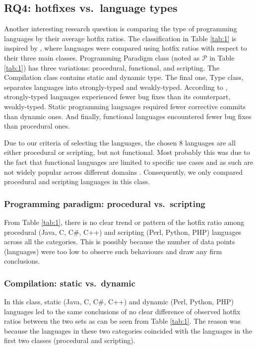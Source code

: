 \documentclass{sig-alternate}
\begin{document}
\subsection{RQ4: hotfixes vs.\ language types}
Another interesting research question is comparing the type of programming languages by their average hotfix ratios. The classification in Table \ref{tab:1} is inspired by \cite{Ray2014}, where languages were compared using hotfix ratios with respect to their three main classes. Programming Paradigm class (noted as $\mathcal{P}$ in Table \ref{tab:1}) has three variations: procedural, functional, and scripting. The Compilation class contains static and dynamic type. The final one, Type class, separates languages into strongly-typed and weakly-typed. According to \cite{Ray2014}, strongly-typed languages experienced fewer bug fixes than its counterpart, weakly-typed. Static programming languages required fewer corrective commits than dynamic ones. And finally, functional languages encountered fewer bug fixes than procedural ones.

Due to our criteria of selecting the languages, the chosen 8 languages are all either procedural or scripting, but not functional. Most probably this was due to the fact that functional languages are limited to specific use cases and as such are not widely popular across different domains  \cite{Wadler1999}. Consequently, we only compared procedural and scripting languages in this class.

\subsubsection*{Programming paradigm: procedural vs.\ scripting}
From Table \ref{tab:1}, there is no clear trend or pattern of the hotfix ratio among procedural (Java, C, C\#, C++) and scripting (Perl, Python, PHP) languages across all the categories. This is possibly because the number of data points (languages) were too low to observe such behaviours and draw any firm conclusions. %

\subsubsection*{Compilation: static vs.\ dynamic}
In this class, static (Java, C, C\#, C++) and dynamic (Perl, Python, PHP) languages led to the same conclusions of no clear difference of observed hotfix ratios between the two sets as can be seen from Table \ref{tab:1}. The reason was because the languages in these two categories coincided with the languages in the first two classes (procedural and scripting).
\end{document}
